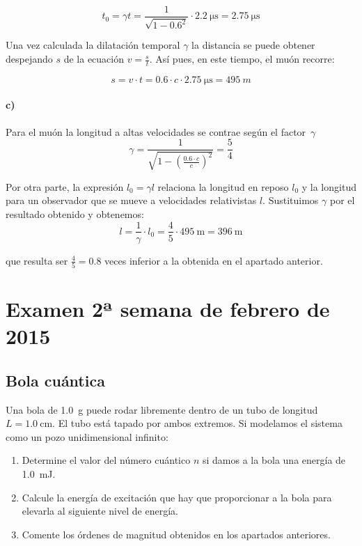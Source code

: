 \documentclass[12pt, a4paper]{article}
\begin{document}
        $$t_0 = \gamma t = \frac{1}{\sqrt{1-\num{0.6}^2}}\cdot \SI{2.2}{\micro\second} = \SI{2.75}{\micro\second}$$

        Una vez calculada la dilatación temporal $\gamma$ la distancia se puede obtener despejando $s$ de
        la ecuación $v=\frac{s}{t}$. Así pues, en este tiempo, el muón recorre:

        $$s=v\cdot t = \num{0.6}\cdot c \cdot \SI{2.75}{\micro\second} = \SI{495}{m}$$

        \paragraph{c)} Para el muón la longitud a altas velocidades se contrae según el \mbox{factor $\gamma$}
        $$\gamma = \frac{1}{\sqrt{1-\left(\frac{\num{0.6}\cdot c}{c}\right)^2}} = \frac{5}{4}$$

        Por otra parte, la expresión $l_0=\gamma l$ relaciona la longitud en reposo $l_0$ y la longitud para
        un observador que se mueve a velocidades relativistas $l$. Sustituimos $\gamma$ por el resultado
        obtenido y obtenemos:
        $$l=\frac{1}{\gamma}\cdot l_0 = \frac{4}{5} \cdot \SI{495}{\meter} = \SI{396}{\meter}$$

        que resulta ser $\frac{4}{5} = \num{0.8}$ veces inferior a la obtenida en el apartado anterior.






    \section{Examen 2ª semana de febrero de 2015}
    \setcounter{subsection}{0}
    \subsection{Bola cuántica}
    Una bola de \SI{1.0}{\gram} puede rodar libremente dentro de un tubo de longitud $L=\SI{1.0}{\centi\meter}$.
    El tubo está tapado por ambos extremos. Si modelamos el sistema como un pozo unidimensional infinito:
    \begin{enumerate}[label=\alph*)]
        \item Determine el valor del número cuántico $n$ si damos a la bola una energía de \SI{1.0}{\milli\J}.
        \item Calcule la energía de excitación que hay que proporcionar a la bola para elevarla al siguiente nivel
        de energía.
        \item Comente los órdenes de magnitud obtenidos en los apartados anteriores.
    \end{enumerate}
\end{document}
